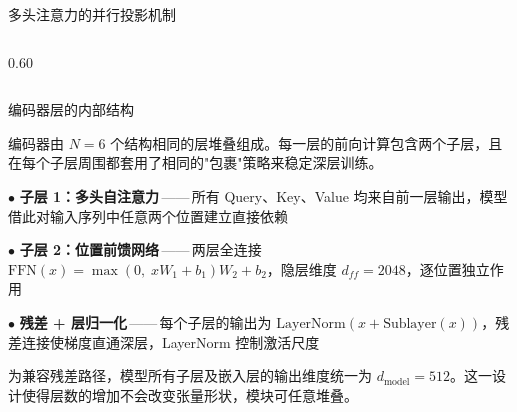 \documentclass[10pt, aspectratio=169, noamsthm, t]{beamer}
\begin{document}
\begin{frame}{多头注意力的并行投影机制}
\begin{columns}[T]
\begin{column}{0.60\textwidth}
\end{column}
\end{columns}
\end{frame}

\begin{frame}{编码器层的内部结构}

编码器由 $N{=}6$ 个结构相同的层堆叠组成。每一层的前向计算包含两个子层，且在每个子层周围都套用了相同的"包裹"策略来稳定深层训练。

\vskip0.2cm

$\bullet$\; \textbf{子层 1：多头自注意力}\,——\,所有 Query、Key、Value 均来自前一层输出，模型借此对输入序列中任意两个位置建立直接依赖

\vskip0.15cm

$\bullet$\; \textbf{子层 2：位置前馈网络}\,——\,两层全连接 $\text{FFN}(x) = \max(0,\; xW_1{+}b_1)W_2{+}b_2$，隐层维度 $d_{ff}{=}2048$，逐位置独立作用

\vskip0.15cm

$\bullet$\; \textbf{残差 + 层归一化}\,——\,每个子层的输出为 $\text{LayerNorm}(x + \text{Sublayer}(x))$，残差连接使梯度直通深层，LayerNorm 控制激活尺度

\vskip0.2cm

为兼容残差路径，模型所有子层及嵌入层的输出维度统一为 $d_{\text{model}}{=}512$。这一设计使得\alert{层数的增加}不会改变张量形状，模块可任意堆叠。
\end{frame}
\end{document}
